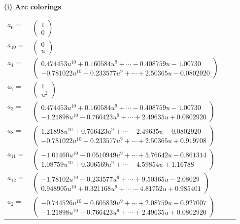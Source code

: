 \documentclass[1p]{elsarticle_modified}
\theoremstyle{definition}
\begin{document}
\flushleft \textbf{(i) Arc colorings}\\
\begin{tabular}{m{7pt} m{180pt} m{7pt} m{180pt} }
\flushright $a_{6}=$&$\begin{pmatrix}1\\0\end{pmatrix}$ \\
\flushright $a_{10}=$&$\begin{pmatrix}0\\u\end{pmatrix}$ \\
\flushright $a_{4}=$&$\begin{pmatrix}0.474453 u^{10}+0.160584 u^{9}+\cdots-0.408759 u-1.00730\\-0.781022 u^{10}-0.233577 u^{9}+\cdots+2.50365 u-0.0802920\end{pmatrix}$ \\
\flushright $a_{7}=$&$\begin{pmatrix}1\\u^2\end{pmatrix}$ \\
\flushright $a_{3}=$&$\begin{pmatrix}0.474453 u^{10}+0.160584 u^{9}+\cdots-0.408759 u-1.00730\\-1.21898 u^{10}-0.766423 u^{9}+\cdots+2.49635 u+0.0802920\end{pmatrix}$ \\
\flushright $a_{8}=$&$\begin{pmatrix}1.21898 u^{10}+0.766423 u^{9}+\cdots-2.49635 u-0.0802920\\-0.781022 u^{10}-0.233577 u^{9}+\cdots+2.50365 u+0.919708\end{pmatrix}$ \\
\flushright $a_{11}=$&$\begin{pmatrix}-1.01460 u^{10}-0.0510949 u^{9}+\cdots+5.76642 u-0.861314\\1.08759 u^{10}+0.306569 u^{9}+\cdots-4.59854 u+1.16788\end{pmatrix}$ \\
\flushright $a_{12}=$&$\begin{pmatrix}-1.78102 u^{10}-0.233577 u^{9}+\cdots+9.50365 u-2.08029\\0.948905 u^{10}+0.321168 u^{9}+\cdots-4.81752 u+0.985401\end{pmatrix}$ \\
\flushright $a_{2}=$&$\begin{pmatrix}-0.744526 u^{10}-0.605839 u^{9}+\cdots+2.08759 u-0.927007\\-1.21898 u^{10}-0.766423 u^{9}+\cdots+2.49635 u+0.0802920\end{pmatrix}$ \\

\end{tabular}
\end{document}
